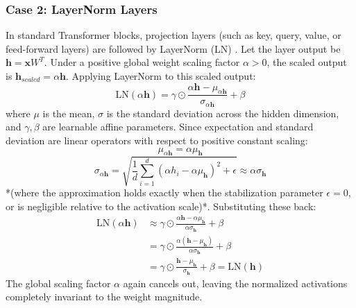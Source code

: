 \subsubsection{Case 2: LayerNorm Layers}
In standard Transformer blocks, projection layers (such as key, query, value, or feed-forward layers) are followed by LayerNorm (LN) \cite{vaswani2017attention}. Let the layer output be $\mathbf{h} = \mathbf{x} W^T$. Under a positive global weight scaling factor $\alpha > 0$, the scaled output is $\mathbf{h}_{scaled} = \alpha \mathbf{h}$. Applying LayerNorm to this scaled output:
\begin{equation}
    \text{LN}(\alpha \mathbf{h}) = \gamma \odot \frac{\alpha \mathbf{h} - \mu_{\alpha \mathbf{h}}}{\sigma_{\alpha \mathbf{h}}} + \beta
\end{equation}
where $\mu$ is the mean, $\sigma$ is the standard deviation across the hidden dimension, and $\gamma, \beta$ are learnable affine parameters. Since expectation and standard deviation are linear operators with respect to positive constant scaling:
\begin{equation}
    \mu_{\alpha \mathbf{h}} = \alpha \mu_{\mathbf{h}}
\end{equation}
\begin{equation}
    \sigma_{\alpha \mathbf{h}} = \sqrt{\frac{1}{d} \sum_{i=1}^d (\alpha h_i - \alpha \mu_{\mathbf{h}})^2 + \epsilon} \approx \alpha \sigma_{\mathbf{h}}
\end{equation}
*(where the approximation holds exactly when the stabilization parameter $\epsilon = 0$, or is negligible relative to the activation scale)*. Substituting these back:
\begin{align}
    \text{LN}(\alpha \mathbf{h}) &\approx \gamma \odot \frac{\alpha \mathbf{h} - \alpha \mu_{\mathbf{h}}}{\alpha \sigma_{\mathbf{h}}} + \beta \nonumber \\
    &= \gamma \odot \frac{\alpha (\mathbf{h} - \mu_{\mathbf{h}})}{\alpha \sigma_{\mathbf{h}}} + \beta \nonumber \\
    &= \gamma \odot \frac{\mathbf{h} - \mu_{\mathbf{h}}}{\sigma_{\mathbf{h}}} + \beta = \text{LN}(\mathbf{h})
\end{align}
The global scaling factor $\alpha$ again cancels out, leaving the normalized activations completely invariant to the weight magnitude.

